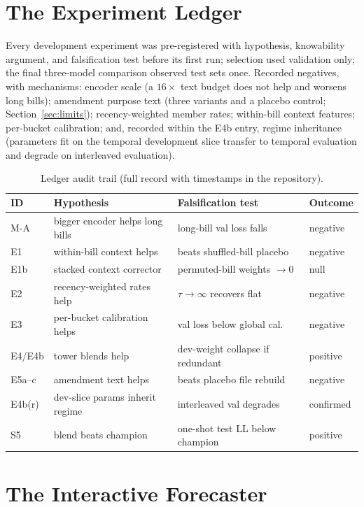 \documentclass[12pt]{article}
\begin{document}
\section{The Experiment Ledger}
\label{app:ledger}

Every development experiment was pre-registered with hypothesis,
knowability argument, and falsification test before its first run;
selection used validation only; the final three-model comparison
observed test sets once. Recorded negatives, with mechanisms: encoder
scale (a $16\times$ text budget does not help and worsens long
bills); amendment purpose text (three variants and a placebo control;
Section~\ref{sec:limits}); recency-weighted member rates; within-bill
context features; per-bucket calibration; and, recorded within the
E4b entry, regime inheritance (parameters fit on the temporal
development slice transfer to temporal evaluation and degrade on
interleaved evaluation).

\begin{table}[h]
\centering
\caption{Ledger audit trail (full record with timestamps in the
repository).}
\label{tab:ledger}
{\small
\begin{tabular}{llll}
\toprule
ID & Hypothesis & Falsification test & Outcome \\
\midrule
M-A & bigger encoder helps long bills & long-bill val loss falls & negative \\
E1 & within-bill context helps & beats shuffled-bill placebo & negative \\
E1b & stacked context corrector & permuted-bill weights $\to 0$ & null \\
E2 & recency-weighted rates help & $\tau\to\infty$ recovers flat & negative \\
E3 & per-bucket calibration helps & val loss below global cal. & negative \\
E4/E4b & tower blends help & dev-weight collapse if redundant & positive \\
E5a--c & amendment text helps & beats placebo file rebuild & negative \\
E4b(r) & dev-slice params inherit regime & interleaved val degrades & confirmed \\
S5 & blend beats champion & one-shot test LL below champion & positive \\
\bottomrule
\end{tabular}}
\end{table}

\section{The Interactive Forecaster}
\label{app:dashboard}
\end{document}
